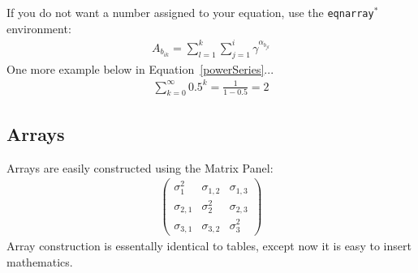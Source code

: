 \documentclass[11pt]{article} %
\begin{document}
If you do not want a number assigned to your equation, use the \texttt{eqnarray$^*$} environment:
\begin{eqnarray*}
A_{b_{ik}} = \sum_{l=1}^{k}\sum_{j=1}^{i} \gamma^{\alpha_{b_{jl}}}
\end{eqnarray*}
One more example below in Equation~\ref{powerSeries}...
\begin{eqnarray}
\sum_{k=0}^{\infty}0.5^k = \frac{1}{1-0.5} = 2
\label{powerSeries}
\end{eqnarray}


\subsection{Arrays}

Arrays are easily constructed using the Matrix Panel:
\begin{eqnarray*}
\left(
	\begin{array}{ccc}
	\sigma_1^2 & \sigma_{1,2} & \sigma_{1,3} \\
	\sigma_{2,1} & \sigma_{2}^2 & \sigma_{2,3} \\
	\sigma_{3,1} & \sigma_{3,2} & \sigma_{3}^2
	\end{array}
\right)
\end{eqnarray*}
Array construction is essentally identical to tables, except now it is easy to insert mathematics.
\end{document}
